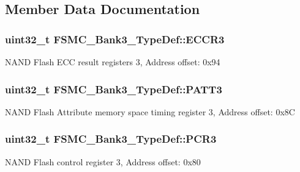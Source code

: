 \subsection{Member Data Documentation}
\subsubsection[{\texorpdfstring{E\+C\+C\+R3}{ECCR3}}]{ uint32\+\_\+t F\+S\+M\+C\+\_\+\+Bank3\+\_\+\+Type\+Def\+::\+E\+C\+C\+R3}\hypertarget{struct_f_s_m_c___bank3___type_def_a6935beb5bbc2de668024c1989eecd46c}{}\label{struct_f_s_m_c___bank3___type_def_a6935beb5bbc2de668024c1989eecd46c}
N\+A\+ND Flash E\+CC result registers 3, Address offset\+: 0x94 
\subsubsection[{\texorpdfstring{P\+A\+T\+T3}{PATT3}}]{ uint32\+\_\+t F\+S\+M\+C\+\_\+\+Bank3\+\_\+\+Type\+Def\+::\+P\+A\+T\+T3}\hypertarget{struct_f_s_m_c___bank3___type_def_a0cbf1b4647f98914238202828de47416}{}\label{struct_f_s_m_c___bank3___type_def_a0cbf1b4647f98914238202828de47416}
N\+A\+ND Flash Attribute memory space timing register 3, Address offset\+: 0x8C 
\subsubsection[{\texorpdfstring{P\+C\+R3}{PCR3}}]{ uint32\+\_\+t F\+S\+M\+C\+\_\+\+Bank3\+\_\+\+Type\+Def\+::\+P\+C\+R3}\hypertarget{struct_f_s_m_c___bank3___type_def_a1f772e1028641cab7b923bf02115b919}{}\label{struct_f_s_m_c___bank3___type_def_a1f772e1028641cab7b923bf02115b919}
N\+A\+ND Flash control register 3, Address offset\+: 0x80 
